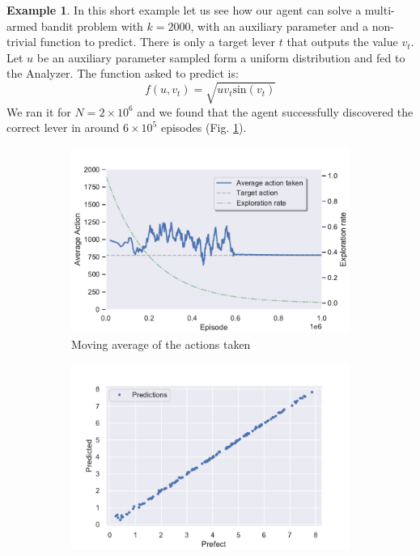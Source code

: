 \documentclass[11pt,a4paper,twoside]{report}
\newcommand{\+}{\textnormal{+} }
\theoremstyle{definition}
\newtheorem{myex}[mythm]{Example}
\numberwithin{equation}{chapter}
\begin{document}
  \begin{myex} \label{2k}
    In this short example let us see how our agent can solve a multi-armed
    bandit problem with $k=2000$, with an auxiliary parameter and a non-trivial
    function to predict. There is only a target lever $t$ that outputs the value
    $v_t$. Let $u$ be an auxiliary parameter sampled form a uniform distribution
    and fed to the Analyzer. The function asked to predict is: 
    \begin{equation}
      f(u,v_t)=\sqrt{uv_t\text{sin}(v_t)}
    \end{equation}
    We ran it for $N=2\times10^6$ and we found that the agent successfully 
    discovered the correct lever in around $6\times10^5$ episodes
    (Fig. \ref{fig:ActionAverageMAB6}).
    

    \begin{figure}[]
      \centering
      \begin{subfigure}{.5\textwidth}
        \centering
        \includegraphics[width=1\linewidth]{figures/Action-MAB6.pdf}
        \caption{Moving average of the actions taken}
        \label{fig:ActionAverageMAB6}
      \end{subfigure}%
      \begin{subfigure}{.5\textwidth}
        \centering
        \includegraphics[width=1\linewidth]{figures/predictions-MBA6.pdf}

\end{subfigure}
\end{figure}
\end{myex}
\end{document}
